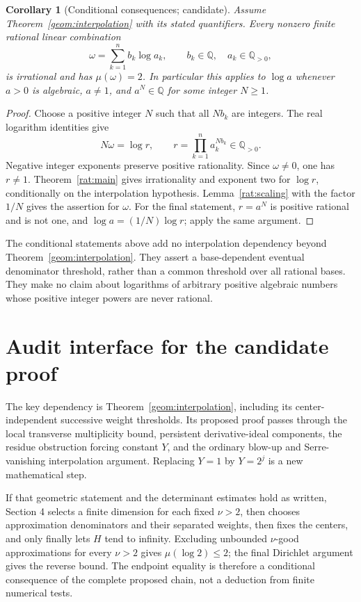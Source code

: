 \documentclass[11pt]{article}
\newcommand{\QQ}{\mathbb Q}
\newtheorem{corollary}[theorem]{Corollary}
\theoremstyle{definition}
\theoremstyle{remark}
\numberwithin{equation}{section}
\begin{document}
\begin{corollary}[Conditional consequences; candidate]
\label{rat:span}
Assume Theorem~\ref{geom:interpolation} with its stated quantifiers.
Every nonzero finite rational linear combination
\[
 \omega=\sum_{k=1}^n b_k\log a_k,
 \qquad b_k\in\QQ,\quad a_k\in\QQ_{>0},
\]
is irrational and has $\mu(\omega)=2$.
In particular this applies to $\log a$ whenever $a>0$ is algebraic,
$a\ne1$, and $a^N\in\QQ$ for some integer $N\ge1$.
\end{corollary}

\begin{proof}
Choose a positive integer $N$ such that all $Nb_k$ are integers.
The real logarithm identities give
\[
 N\omega=\log r,\qquad
 r=\prod_{k=1}^n a_k^{Nb_k}\in\QQ_{>0}.
\]
Negative integer exponents preserve positive rationality.  Since
$\omega\ne0$, one has $r\ne1$.  Theorem~\ref{rat:main} gives
irrationality and exponent two for $\log r$, conditionally on the
interpolation hypothesis.  Lemma~\ref{rat:scaling} with the factor
$1/N$ gives the assertion for $\omega$.
For the final statement, $r=a^N$ is positive rational and is not one,
and $\log a=(1/N)\log r$; apply the same argument.
\end{proof}

The conditional statements above add no interpolation dependency beyond
Theorem~\ref{geom:interpolation}.  They assert a base-dependent eventual
denominator threshold, rather than a common threshold over all rational
bases.  They make no claim about logarithms of arbitrary positive
algebraic numbers whose positive integer powers are never rational.


\section{Audit interface for the candidate proof}
The key dependency is Theorem~\ref{geom:interpolation}, including its
center-independent successive weight thresholds. Its proposed proof
passes through the local transverse multiplicity bound, persistent
derivative-ideal components, the residue obstruction forcing constant
$Y$, and the ordinary blow-up and Serre-vanishing interpolation argument.
Replacing $Y=1$ by $Y=2^j$ is a new mathematical step.

If that geometric statement and the determinant estimates hold as
written, Section 4 selects a finite dimension for each fixed $\nu>2$,
then chooses approximation denominators and their separated weights,
then fixes the centers, and only finally lets $H$ tend to infinity.
Excluding unbounded $\nu$-good approximations for every $\nu>2$ gives
$\mu(\log2)\le2$; the final Dirichlet argument gives the reverse bound.
The endpoint equality is therefore a conditional consequence of the
complete proposed chain, not a deduction from finite numerical tests.
\end{document}
